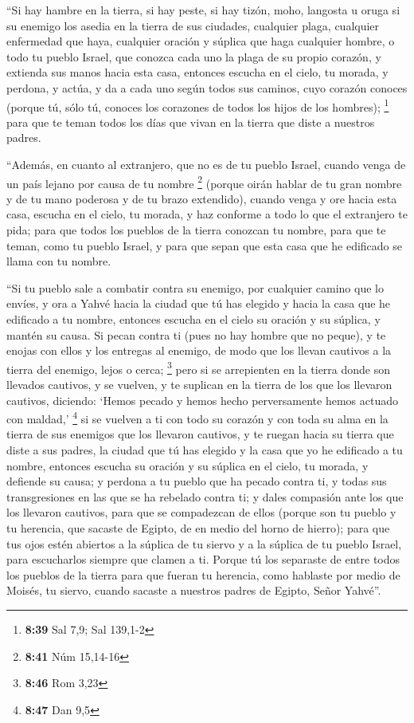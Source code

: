  ``Si hay hambre en la tierra, si hay peste, si hay
tizón, moho, langosta u oruga si su enemigo los asedia en la tierra de
sus ciudades, cualquier plaga, cualquier enfermedad que haya,
 cualquier oración y súplica que haga cualquier hombre, o
todo tu pueblo Israel, que conozca cada uno la plaga de su propio
corazón, y extienda sus manos hacia esta casa,  entonces
escucha en el cielo, tu morada, y perdona, y actúa, y da a cada uno
según todos sus caminos, cuyo corazón conoces (porque tú, sólo tú,
conoces los corazones de todos los hijos de los hombres); \footnote{\textbf{8:39}
  Sal 7,9; Sal 139,1-2}  para que te teman todos los días
que vivan en la tierra que diste a nuestros padres.

 ``Además, en cuanto al extranjero, que no es de tu
pueblo Israel, cuando venga de un país lejano por causa de tu nombre
\footnote{\textbf{8:41} Núm 15,14-16}  (porque oirán
hablar de tu gran nombre y de tu mano poderosa y de tu brazo extendido),
cuando venga y ore hacia esta casa,  escucha en el cielo,
tu morada, y haz conforme a todo lo que el extranjero te pida; para que
todos los pueblos de la tierra conozcan tu nombre, para que te teman,
como tu pueblo Israel, y para que sepan que esta casa que he edificado
se llama con tu nombre.

 ``Si tu pueblo sale a combatir contra su enemigo, por
cualquier camino que lo envíes, y ora a Yahvé hacia la ciudad que tú has
elegido y hacia la casa que he edificado a tu nombre, 
entonces escucha en el cielo su oración y su súplica, y mantén su causa.
 Si pecan contra ti (pues no hay hombre que no peque), y
te enojas con ellos y los entregas al enemigo, de modo que los llevan
cautivos a la tierra del enemigo, lejos o cerca; \footnote{\textbf{8:46}
  Rom 3,23}  pero si se arrepienten en la tierra donde
son llevados cautivos, y se vuelven, y te suplican en la tierra de los
que los llevaron cautivos, diciendo: `Hemos pecado y hemos hecho
perversamente hemos actuado con maldad,' \footnote{\textbf{8:47} Dan 9,5}
 si se vuelven a ti con todo su corazón y con toda su
alma en la tierra de sus enemigos que los llevaron cautivos, y te ruegan
hacia su tierra que diste a sus padres, la ciudad que tú has elegido y
la casa que yo he edificado a tu nombre,  entonces
escucha su oración y su súplica en el cielo, tu morada, y defiende su
causa;  y perdona a tu pueblo que ha pecado contra ti, y
todas sus transgresiones en las que se ha rebelado contra ti; y dales
compasión ante los que los llevaron cautivos, para que se compadezcan de
ellos  (porque son tu pueblo y tu herencia, que sacaste
de Egipto, de en medio del horno de hierro);  para que
tus ojos estén abiertos a la súplica de tu siervo y a la súplica de tu
pueblo Israel, para escucharlos siempre que clamen a ti. 
Porque tú los separaste de entre todos los pueblos de la tierra para que
fueran tu herencia, como hablaste por medio de Moisés, tu siervo, cuando
sacaste a nuestros padres de Egipto, Señor Yahvé''.

